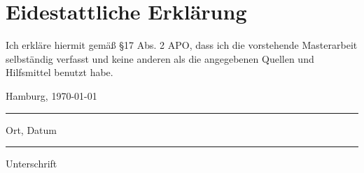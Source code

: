\chapter*{Eidestattliche Erklärung}
\label{sec:S9_Eid}



Ich erkläre hiermit gemäß §17 Abs. 2 APO, dass ich die vorstehende Masterarbeit selbständig verfasst und keine anderen als die angegebenen Quellen und Hilfsmittel benutzt habe.
\vspace{5cm}



\parbox{5cm}{\centering Hamburg, \today\hrule
\strut \centering Ort, Datum} \hfill
\parbox{5cm}{  \hrule
\strut \centering Unterschrift}